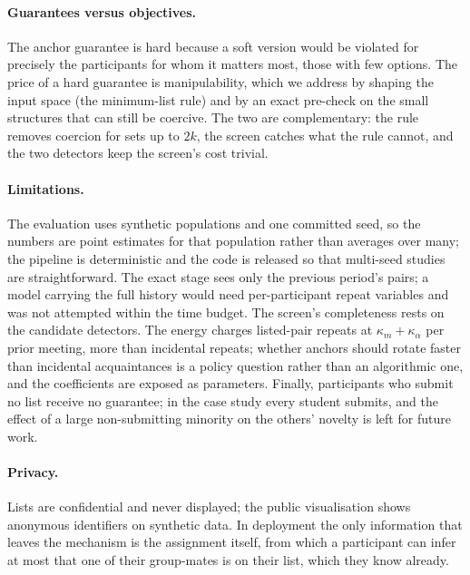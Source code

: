 \documentclass[11pt,a4paper]{article}
\theoremstyle{plain}
\theoremstyle{definition}
\theoremstyle{remark}
\begin{document}
\paragraph{Guarantees versus objectives.} The anchor guarantee is hard because a soft version would be violated for precisely the participants for whom it matters most, those with few options. The price of a hard guarantee is manipulability, which we address by shaping the input space (the minimum-list rule) and by an exact pre-check on the small structures that can still be coercive. The two are complementary: the rule removes coercion for sets up to $2k$, the screen catches what the rule cannot, and the two detectors keep the screen's cost trivial.

\paragraph{Limitations.} The evaluation uses synthetic populations and one committed seed, so the numbers are point estimates for that population rather than averages over many; the pipeline is deterministic and the code is released so that multi-seed studies are straightforward. The exact stage sees only the previous period's pairs; a model carrying the full history would need per-participant repeat variables and was not attempted within the time budget. The screen's completeness rests on the candidate detectors. The energy charges listed-pair repeats at $\kappa_m + \kappa_\alpha$ per prior meeting, more than incidental repeats; whether anchors should rotate faster than incidental acquaintances is a policy question rather than an algorithmic one, and the coefficients are exposed as parameters. Finally, participants who submit no list receive no guarantee; in the case study every student submits, and the effect of a large non-submitting minority on the others' novelty is left for future work.

\paragraph{Privacy.} Lists are confidential and never displayed; the public visualisation shows anonymous identifiers on synthetic data. In deployment the only information that leaves the mechanism is the assignment itself, from which a participant can infer at most that one of their group-mates is on their list, which they know already.
\end{document}
